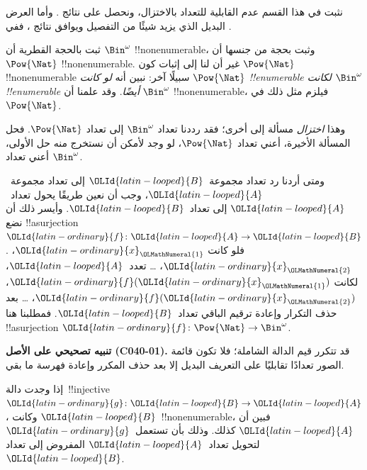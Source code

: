 \documentclass[../../../include/open-logic-section]{subfiles}
\begin{document}


\begin{editorial}
نثبت في هذا القسم عدم القابلية للتعداد بالاختزال، ونحصل على نتائج . وأما العرض البديل الذي يزيد شيئًا من التفصيل ويوافق نتائج ، ففي .
\end{editorial}

ثبت بالحجة القطرية أن $\Bin^\omega$ !!{nonenumerable}، وثبت بحجة من جنسها أن $\Pow{\Nat}$ !!{nonenumerable}. غير أن لنا إلى إثبات كون $\Pow{\Nat}$ !!{nonenumerable} سبيلًا آخر: نبين أنه \emph{لو كانت $\Pow{\Nat}$ !!{enumerable} لكانت $\Bin^\omega$ !!{enumerable} أيضًا}. وقد علمنا أن $\Bin^\omega$ !!{nonenumerable}، فيلزم مثل ذلك في $\Pow{\Nat}$.

وهذا \emph{اختزال} مسألة إلى أخرى؛ فقد رددنا تعداد $\Bin^\omega$ إلى تعداد $\Pow{\Nat}$. فحل المسألة الأخيرة، أعني تعداد $\Pow{\Nat}$، لو وجد لأمكن أن نستخرج منه حل الأولى، أعني تعداد $\Bin^\omega$.

ومتى أردنا رد تعداد مجموعة~${\OLId{latin-looped}{B}}$ إلى تعداد مجموعة~${\OLId{latin-looped}{A}}$، وجب أن نعين طريقًا يحول تعداد~${\OLId{latin-looped}{A}}$ إلى تعداد~${\OLId{latin-looped}{B}}$. وأيسر ذلك أن نضع !!a{surjection} ${\OLId{latin-ordinary}{f}}\colon {\OLId{latin-looped}{A}} \to {\OLId{latin-looped}{B}}$. فلو كانت ${\OLId{latin-ordinary}{x}}_{\OLMathNumeral{1}}$، ${\OLId{latin-ordinary}{x}}_{\OLMathNumeral{2}}$، \dots{} تعدد~${\OLId{latin-looped}{A}}$، لكانت ${\OLId{latin-ordinary}{f}}({\OLId{latin-ordinary}{x}}_{\OLMathNumeral{1}})$، ${\OLId{latin-ordinary}{f}}({\OLId{latin-ordinary}{x}}_{\OLMathNumeral{2}})$، \dots{} بعد حذف التكرار وإعادة ترقيم الباقي تعداد~${\OLId{latin-looped}{B}}$. فمطلبنا هنا !!a{surjection} ${\OLId{latin-ordinary}{f}}\colon \Pow{\Nat}
\to \Bin^\omega$.

\textbf{تنبيه تصحيحي على الأصل (C040-01).} قد تتكرر قيم الدالة الشاملة؛ فلا تكون
قائمة الصور تعدادًا تقابليًا على التعريف البديل إلا بعد حذف المكرر وإعادة
فهرسة ما بقي.

\begin{prob}
إذا وجدت دالة~!!{injective} ${\OLId{latin-ordinary}{g}}\colon {\OLId{latin-looped}{B}} \to {\OLId{latin-looped}{A}}$، وكانت ${\OLId{latin-looped}{B}}$~!!{nonenumerable}، فبين أن ${\OLId{latin-looped}{A}}$ كذلك. وذلك بأن تستعمل~${\OLId{latin-ordinary}{g}}$ لتحويل تعداد~${\OLId{latin-looped}{A}}$ المفروض إلى تعداد~${\OLId{latin-looped}{B}}$.
\end{prob}
\end{document}
